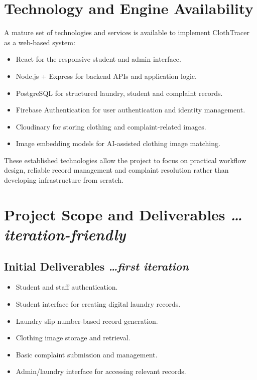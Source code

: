 \documentclass[11pt,a4paper]{article}
\newcommand{\BvrHint}[1]{%
  {\normalfont\normalsize\itshape\hfill #1}}
\begin{document}
\section{Technology and Engine Availability}

A mature set of technologies and services is available to implement ClothTracer as a web-based system:
\begin{itemize}[leftmargin=0.7cm]
    \item React for the responsive student and admin interface.
    \item Node.js + Express for backend APIs and application logic.
    \item PostgreSQL for structured laundry, student and complaint records.
    \item Firebase Authentication for user authentication and identity management.
    \item Cloudinary for storing clothing and complaint-related images.
    \item Image embedding models for AI-assisted clothing image matching.
\end{itemize}

These established technologies allow the project to focus on practical workflow design, reliable record management and complaint resolution rather than developing infrastructure from scratch.


\section{Project Scope and Deliverables %
\BvrHint{\ldots iteration-friendly}}

\subsection{Initial Deliverables %
\BvrHint{\ldots first iteration}}

\begin{itemize}[leftmargin=0.7cm]
    \item Student and staff authentication.
    \item Student interface for creating digital laundry records.
    \item Laundry slip number-based record generation.
    \item Clothing image storage and retrieval.
    \item Basic complaint submission and management.
    \item Admin/laundry interface for accessing relevant records.
\end{itemize}
\end{document}
